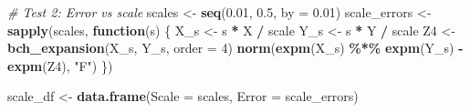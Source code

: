 \documentclass[
]{book}
\newenvironment{Shaded}{\begin{snugshade}}{\end{snugshade}}
\newcommand{\AttributeTok}[1]{\textcolor[rgb]{0.13,0.29,0.53}{#1}}
\newcommand{\CommentTok}[1]{\textcolor[rgb]{0.56,0.35,0.01}{\textit{#1}}}
\newcommand{\ControlFlowTok}[1]{\textcolor[rgb]{0.13,0.29,0.53}{\textbf{#1}}}
\newcommand{\DecValTok}[1]{\textcolor[rgb]{0.00,0.00,0.81}{#1}}
\newcommand{\FloatTok}[1]{\textcolor[rgb]{0.00,0.00,0.81}{#1}}
\newcommand{\FunctionTok}[1]{\textcolor[rgb]{0.13,0.29,0.53}{\textbf{#1}}}
\newcommand{\NormalTok}[1]{#1}
\newcommand{\OtherTok}[1]{\textcolor[rgb]{0.56,0.35,0.01}{#1}}
\newcommand{\SpecialCharTok}[1]{\textcolor[rgb]{0.81,0.36,0.00}{\textbf{#1}}}
\newcommand{\StringTok}[1]{\textcolor[rgb]{0.31,0.60,0.02}{#1}}
\theoremstyle{definition}
\theoremstyle{definition}
\theoremstyle{definition}
\theoremstyle{definition}
\theoremstyle{remark}
\begin{document}
\begin{Shaded}
\begin{Highlighting}[]
\CommentTok{\# Test 2: Error vs scale}
\NormalTok{scales }\OtherTok{\textless{}{-}} \FunctionTok{seq}\NormalTok{(}\FloatTok{0.01}\NormalTok{, }\FloatTok{0.5}\NormalTok{, }\AttributeTok{by =} \FloatTok{0.01}\NormalTok{)}
\NormalTok{scale\_errors }\OtherTok{\textless{}{-}} \FunctionTok{sapply}\NormalTok{(scales, }\ControlFlowTok{function}\NormalTok{(s) \{}
\NormalTok{  X\_s }\OtherTok{\textless{}{-}}\NormalTok{ s }\SpecialCharTok{*}\NormalTok{ X }\SpecialCharTok{/}\NormalTok{ scale}
\NormalTok{  Y\_s }\OtherTok{\textless{}{-}}\NormalTok{ s }\SpecialCharTok{*}\NormalTok{ Y }\SpecialCharTok{/}\NormalTok{ scale}
\NormalTok{  Z4 }\OtherTok{\textless{}{-}} \FunctionTok{bch\_expansion}\NormalTok{(X\_s, Y\_s, }\AttributeTok{order =} \DecValTok{4}\NormalTok{)}
  \FunctionTok{norm}\NormalTok{(}\FunctionTok{expm}\NormalTok{(X\_s) }\SpecialCharTok{\%*\%} \FunctionTok{expm}\NormalTok{(Y\_s) }\SpecialCharTok{{-}} \FunctionTok{expm}\NormalTok{(Z4), }\StringTok{"F"}\NormalTok{)}
\NormalTok{\})}

\NormalTok{scale\_df }\OtherTok{\textless{}{-}} \FunctionTok{data.frame}\NormalTok{(}\AttributeTok{Scale =}\NormalTok{ scales, }\AttributeTok{Error =}\NormalTok{ scale\_errors)}


\end{Highlighting}
\end{Shaded}
\end{document}
